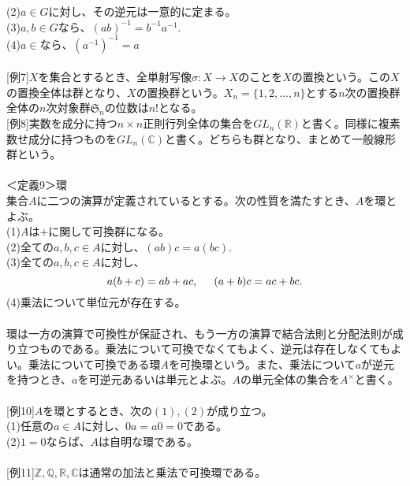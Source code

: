 \documentclass{jsarticle}
\begin{document}
\hspace{5mm}(2)\(a\in G\)に対し、その逆元は一意的に定まる。\\
\hspace{5mm}(3)\(a,b\in G\)なら、\((ab)^{-1}=b^{-1}a^{-1}\).\\
\hspace{5mm}(4)\(a\in \)なら、\((a^{-1})^{-1}=a\)\\
\\
\hspace{5mm}[例7]\(X\)を集合とするとき、全単射写像\(\sigma:X\rightarrow X\)のことを\(X\)の置換という。この\(X\)の置換全体は群となり、\(X\)の置換群という。\(X_{n}=\{1,2,...,n\}\)とする\(n\)次の置換群全体の\(n\)次対象群\(\mathfrak{S}_{n}\)の位数は\(n!\)となる。\\
\hspace{5mm}[例8]実数を成分に持つ\(n\times n\)正則行列全体の集合を\(GL_{n}(\mathbb{R})\)と書く。同様に複素数せ成分に持つものを\(GL_{n}(\mathbb{C})\)と書く。どちらも群となり、まとめて一般線形群という。\\
\\
＜定義9＞環\\
集合\(A\)に二つの演算が定義されているとする。次の性質を満たすとき、\(A\)を環とよぶ。\\
(1)\(A\)は\(+\)に関して可換群になる。\\
(2)全ての\(a,b,c\in A\)に対し、\((ab)c=a(bc)\).\\
(3)全ての\(a,b,c\in A\)に対し、
\[a(b+c)=ab+ac,\hspace{5mm}(a+b)c=ac+bc.\]
(4)乗法について単位元が存在する。\\
\\
環は一方の演算で可換性が保証され、もう一方の演算で結合法則と分配法則が成り立つものである。乗法について可換でなくてもよく、逆元は存在しなくてもよい。乗法について可換である環\(A\)を可換環という。また、乗法について\(a\)が逆元を持つとき、\(a\)を可逆元あるいは単元とよぶ。\(A\)の単元全体の集合を\(A^{\times}\)と書く。\\
\\
\hspace{5mm}[例10]\(A\)を環とするとき、次の\((1),(2)\)が成り立つ。\\
\hspace{5mm}(1)任意の\(a\in A\)に対し、\(0a=a0=0\)である。\\
\hspace{5mm}(2)\(1=0\)ならば、\(A\)は自明な環である。\\
\\
\hspace{5mm}[例11]\(\mathbb{Z},\mathbb{Q},\mathbb{R},\mathbb{C}\)は通常の加法と乗法で可換環である。\\
\end{document}
